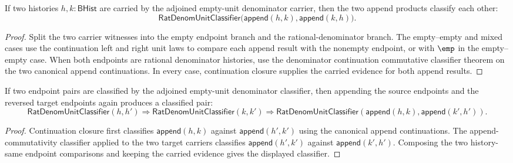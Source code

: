 \begin{theorem}
\label{thm:field-rat-denom-unit-classifier-append-comm}
If two histories \(h,k:\mathsf{BHist}\) are carried by the adjoined empty-unit
denominator carrier, then the two append products classify each other:
$$
\mathsf{RatDenomUnitClassifier}
\bigl(\mathsf{append}(h,k),\mathsf{append}(k,h)\bigr).
$$
\end{theorem}
\begin{proof}
Split the two carrier witnesses into the empty endpoint branch and the
rational-denominator branch. The empty--empty and mixed cases use the
continuation left and right unit laws to compare each append result with the
nonempty endpoint, or with \(\emp\) in the empty--empty case. When both
endpoints are rational denominator histories, use the denominator continuation
commutative classifier theorem on the two canonical append continuations.
In every case, continuation closure supplies the carried evidence for both
append results.
\end{proof}

\begin{theorem}
\label{thm:rat-denom-unit-classifier-append-comm-congruence}
If two endpoint pairs are classified by the adjoined empty-unit denominator
classifier, then appending the source endpoints and the reversed target
endpoints again produces a classified pair:
$$
\mathsf{RatDenomUnitClassifier}(h,h')\Rightarrow
\mathsf{RatDenomUnitClassifier}(k,k')\Rightarrow
\mathsf{RatDenomUnitClassifier}(\mathsf{append}(h,k),\mathsf{append}(k',h')).
$$
\end{theorem}
\begin{proof}
Continuation closure first classifies
$\mathsf{append}(h,k)$ against $\mathsf{append}(h',k')$ using the canonical
append continuations. The append-commutativity classifier applied to the two
target carriers classifies $\mathsf{append}(h',k')$ against
$\mathsf{append}(k',h')$. Composing the two history-same endpoint comparisons
and keeping the carried evidence gives the displayed classifier.
\end{proof}
